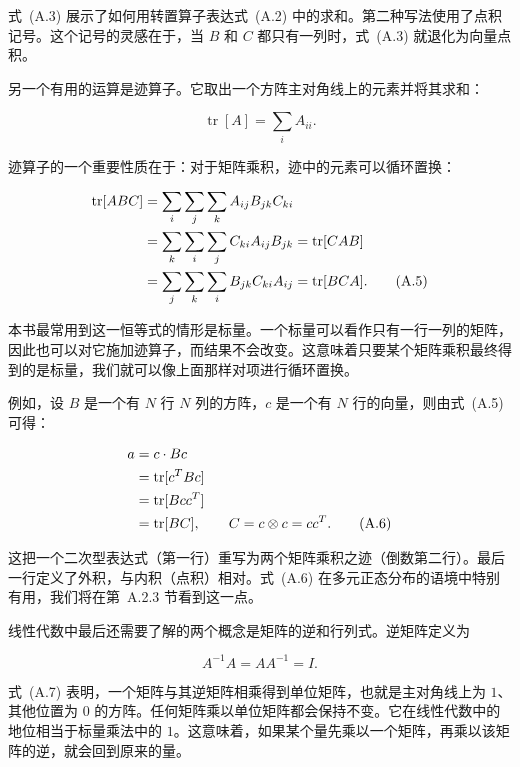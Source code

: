式~(A.3) 展示了如何用转置算子表达式~(A.2) 中的求和。第二种写法使用了点积记号。这个记号的灵感在于，当 $B$ 和 $C$ 都只有一列时，式~(A.3) 就退化为向量点积。

另一个有用的运算是迹算子。它取出一个方阵主对角线上的元素并将其求和：

\begin{equation}
\operatorname{tr}[A] = \sum_i A_{ii}.
\tag{A.4}
\end{equation}

迹算子的一个重要性质在于：对于矩阵乘积，迹中的元素可以循环置换：

\begin{align}
\operatorname{tr}[ABC]
&= \sum_i \sum_j \sum_k A_{ij} B_{jk} C_{ki} \notag \\
&= \sum_k \sum_i \sum_j C_{ki} A_{ij} B_{jk}
= \operatorname{tr}[CAB] \notag \\
&= \sum_j \sum_k \sum_i B_{jk} C_{ki} A_{ij}
= \operatorname{tr}[BCA].
\tag{A.5}
\end{align}

本书最常用到这一恒等式的情形是标量。一个标量可以看作只有一行一列的矩阵，因此也可以对它施加迹算子，而结果不会改变。这意味着只要某个矩阵乘积最终得到的是标量，我们就可以像上面那样对项进行循环置换。

例如，设 $B$ 是一个有 $N$ 行 $N$ 列的方阵，$c$ 是一个有 $N$ 行的向量，则由式~(A.5) 可得：

\begin{align}
a &= c \cdot Bc \notag \\
&= \operatorname{tr}[c^T Bc] \notag \\
&= \operatorname{tr}[Bcc^T] \notag \\
&= \operatorname{tr}[BC],
\qquad
C = c \otimes c = cc^T.
\tag{A.6}
\end{align}

这把一个二次型表达式（第一行）重写为两个矩阵乘积之迹（倒数第二行）。最后一行定义了外积，与内积（点积）相对。式~(A.6) 在多元正态分布的语境中特别有用，我们将在第~A.2.3 节看到这一点。

线性代数中最后还需要了解的两个概念是矩阵的逆和行列式。逆矩阵定义为

\begin{equation}
A^{-1} A = A A^{-1} = I.
\tag{A.7}
\end{equation}

式~(A.7) 表明，一个矩阵与其逆矩阵相乘得到单位矩阵，也就是主对角线上为 $1$、其他位置为 $0$ 的方阵。任何矩阵乘以单位矩阵都会保持不变。它在线性代数中的地位相当于标量乘法中的 $1$。这意味着，如果某个量先乘以一个矩阵，再乘以该矩阵的逆，就会回到原来的量。

